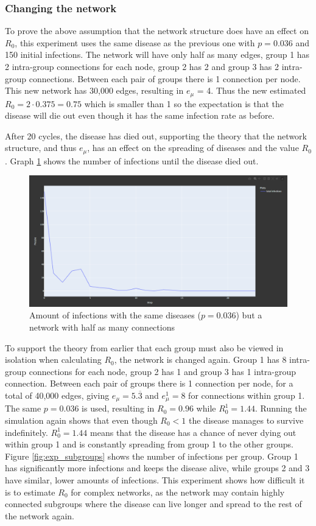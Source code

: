 \subsubsection{Changing the network}
To prove the above assumption that the network structure does have an effect on $R_0$, this experiment uses the same disease as the previous one with $p=0.036$ and 150 initial infections. The network will have only half as many edges, group 1 has 2 intra-group connections for each node, group 2 has 2 and group 3 has 2 intra-group connections. Between each pair of groups there is 1 connection per node. This new network has 30,000 edges, resulting in $e_\mu$ = 4. Thus the new estimated $R_0=2\cdot0.375=0.75$ which is smaller than 1 so the expectation is that the disease will die out even though it has the same infection rate as before.

After 20 cycles, the disease has died out, supporting the theory that the network structure, and thus $e_\mu$, has an effect on the spreading of diseases and the value $R_0$. Graph \ref{fig:exp_change_network} shows the number of infections until the disease died out.

\begin{figure}
    \centering
    \includegraphics[width=0.5\linewidth]{images/exp_changed_network.png}
    \caption{Amount of infections with the same diseases ($p = 0.036$) but a network with half as many connections}
    \label{fig:exp_change_network}
\end{figure}

To support the theory from earlier that each group must also be viewed in isolation when calculating $R_0$, the network is changed again. Group 1 has 8 intra-group connections for each node, group 2 has 1 and group 3 has 1 intra-group connection. Between each pair of groups there is 1 connection per node, for a total of 40,000 edges, giving $e_\mu=5.\overline{3}$ and $e_\mu^1=8$ for connections within group 1. The same $p = 0.036$ is used, resulting in $R_0 = 0.96$ while $R_0^1 = 1.44$. Running the simulation again shows that even though $R_0 < 1$ the disease manages to survive indefinitely. $R_0^1 = 1.44$ means that the disease has a chance of never dying out within group 1 and is constantly spreading from group 1 to the other groups. Figure \ref{fig:exp_subgroups} shows the number of infections per group. Group 1 has significantly more infections and keeps the disease alive, while groups 2 and 3 have similar, lower amounts of infections. This experiment shows how difficult it is to estimate $R_0$ for complex networks, as the network may contain highly connected subgroups where the disease can live longer and spread to the rest of the network again.

